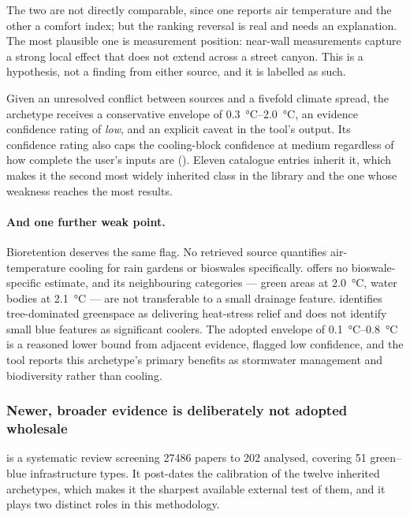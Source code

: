 The two are not directly comparable, since one reports air temperature and the
other a comfort index; but the ranking reversal is real and needs an
explanation. The most plausible one is measurement position: near-wall
measurements capture a strong local effect that does not extend across a street
canyon. This is a hypothesis, not a finding from either source, and it is
labelled as such.

Given an unresolved conflict between sources and a fivefold climate spread, the
archetype receives a conservative envelope of
\SIrange{0.3}{2.0}{\degreeCelsius}, an evidence confidence rating of
\emph{low}, and an explicit caveat in the tool's output. Its confidence rating
also caps the cooling-block confidence at medium regardless of how complete the
user's inputs are (). Eleven catalogue entries
inherit it, which makes it the second most widely inherited class in the
library and the one whose weakness reaches the most results.

\paragraph{And one further weak point.} Bioretention deserves the same flag. No
retrieved source quantifies air-temperature cooling for rain gardens or
bioswales specifically. \textcite{keravec2026} offers no bioswale-specific
estimate, and its neighbouring categories --- green areas at
\qty{2.0}{\degreeCelsius}, water bodies at \qty{2.1}{\degreeCelsius} --- are
not transferable to a small drainage feature.
\textcite{gunawardena2017} identifies tree-dominated greenspace as delivering
heat-stress relief and does not identify small blue features as significant
coolers. The adopted envelope of \SIrange{0.1}{0.8}{\degreeCelsius} is a
reasoned lower bound from adjacent evidence, flagged low confidence, and the
tool reports this archetype's primary benefits as stormwater management and
biodiversity rather than cooling.

\subsubsection{Newer, broader evidence is deliberately not adopted wholesale}
\label{sec:non-adoption}

\textcite{kumar2024} is a systematic review screening \num{27486} papers to
\num{202} analysed, covering \num{51} green--blue infrastructure types. It
post-dates the calibration of the twelve inherited archetypes, which makes it
the sharpest available external test of them, and it plays two distinct roles
in this methodology.

